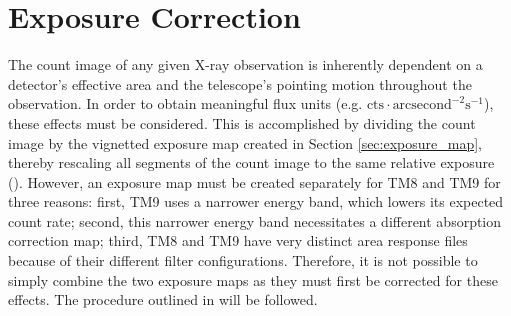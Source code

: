 \section{Exposure Correction}\label{sec:exposure}
The count image of any given X-ray observation is inherently dependent on a detector's effective area and the telescope's pointing motion throughout the observation. In order to obtain meaningful flux units (e.g. \(\text{cts}\cdot\text{arcsecond}^{-2}\text{s}^{-1}\)), these effects must be considered. This is accomplished by dividing the count image by the vignetted exposure map created in Section \ref{sec:exposure_map}, thereby rescaling all segments of the count image to the same relative exposure (\cite{davis2001formal}). However, an exposure map must be created separately for TM8 and TM9 for three reasons: first, TM9 uses a narrower energy band, which lowers its expected count rate; second, this narrower energy band necessitates a different absorption correction map; third, TM8 and TM9 have very distinct area response files because of their different filter configurations. Therefore, it is not possible to simply combine the two exposure maps as they must first be corrected for these effects. The procedure outlined in \citet{Reiprich2021} will be followed. 

